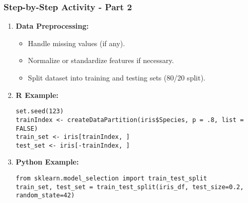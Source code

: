\documentclass[aspectratio=169]{beamer}
\begin{document}
\begin{frame}[fragile]
    \frametitle{Step-by-Step Activity - Part 2}
    \begin{enumerate}[resume]
        \item \textbf{Data Preprocessing:}
        \begin{itemize}
            \item Handle missing values (if any).
            \item Normalize or standardize features if necessary.
            \item Split dataset into training and testing sets (80/20 split).
        \end{itemize}

        \item \textbf{R Example:}
        \begin{lstlisting}
set.seed(123)
trainIndex <- createDataPartition(iris$Species, p = .8, list = FALSE)
train_set <- iris[trainIndex, ]
test_set <- iris[-trainIndex, ]
        \end{lstlisting}

        \item \textbf{Python Example:}
        \begin{lstlisting}
from sklearn.model_selection import train_test_split
train_set, test_set = train_test_split(iris_df, test_size=0.2, random_state=42)
        \end{lstlisting}
    \end{enumerate}
\end{frame}
\end{document}
